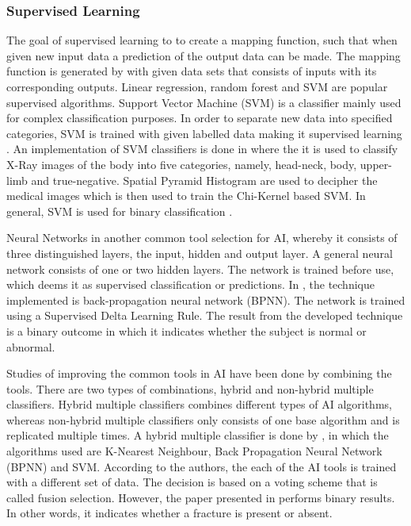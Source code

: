 \documentclass[11pt,twocolumn]{witseiepaper}
\begin{document}
	\subsubsection{\textbf{Supervised Learning}}
	The goal of supervised learning to to create a mapping function, such that when given new input data a prediction of the output data can be made. The mapping function is generated by with given data sets that consists of inputs with its corresponding outputs. Linear regression, random forest and SVM are popular supervised algorithms.
	Support Vector Machine (SVM) is a classifier mainly used for complex classification purposes. In order to separate new data into specified categories, SVM is trained with given labelled data making it supervised learning \cite{Rebentrost2014}. An implementation of SVM classifiers is done in \cite{saha_classifying_2016} where the it is used to classify X-Ray images of the body into five categories, namely, head-neck, body, upper-limb and true-negative. Spatial Pyramid Histogram are used to decipher the medical images which is then used to train the Chi-Kernel based SVM. In general, SVM is used for binary classification \cite{Rebentrost2014}.
	
	Neural Networks in another common tool selection for AI, whereby it consists of three distinguished layers, the input, hidden and output layer. A general neural network consists of one or two hidden layers. The network is trained before use, which deems it as supervised classification or predictions. In \cite{jyothi_congenital_2016}, the technique implemented is back-propagation neural network (BPNN). The network is trained using a Supervised Delta Learning Rule. The result from the developed technique is a binary outcome in which it indicates whether the subject is normal or abnormal.
	
	Studies of improving the common tools in AI have been done by combining the tools. There are two types of combinations, hybrid and non-hybrid multiple classifiers. Hybrid multiple classifiers combines different types of AI algorithms, whereas non-hybrid multiple classifiers only consists of one base algorithm and is replicated multiple times. A hybrid multiple classifier is done by \cite{multiple_classification}, in which the algorithms used are K-Nearest Neighbour, Back Propagation Neural Network (BPNN) and SVM. According to the authors, the each of the AI tools is trained with a different set of data. The decision is based on a voting scheme that is called fusion selection. However, the paper presented in \cite{multiple_classification} performs binary results. In other words, it indicates whether a fracture is present or absent. 
	
\end{document}
